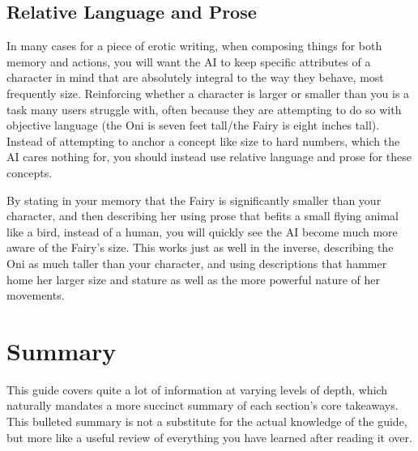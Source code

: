﻿\documentclass[Coomer-main.tex]{subfiles}
\begin{document}
\section{Relative Language and Prose}

In many cases for a piece of erotic writing, when composing things for both memory and actions, you will want the AI to keep specific attributes of a character in mind that are absolutely integral to the way they behave, most frequently size.
Reinforcing whether a character is larger or smaller than you is a task many users struggle with, often because they are attempting to do so with objective language (the Oni is seven feet tall/the Fairy is eight inches tall).
Instead of attempting to anchor a concept like size to hard numbers, which the AI cares nothing for, you should instead use relative language and prose for these concepts.

By stating in your memory that the Fairy is significantly smaller than your character, and then describing her using prose that befits a small flying animal like a bird, instead of a human, you will quickly see the AI become much more aware of the Fairy’s size.
This works just as well in the inverse, describing the Oni as much taller than your character, and using descriptions that hammer home her larger size and stature as well as the more powerful nature of her movements.

\chapter{Summary}
\label{ch:summary}

This guide covers quite a lot of information at varying levels of depth, which naturally mandates a more succinct summary of each section's core takeaways.
This bulleted summary is not a substitute for the actual knowledge of the guide, but more like a useful review of everything you have learned after reading it over.
\end{document}
